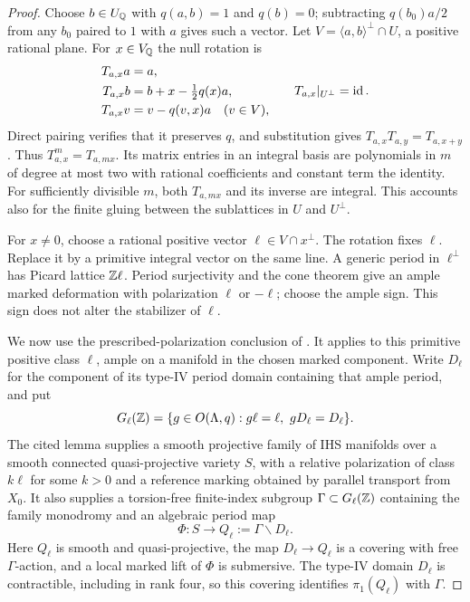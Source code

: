 \begin{proof}
Choose $b\in U_{\mathbb Q}$ with $q(a,b)=1$ and $q(b)=0$; subtracting
$q(b_0)a/2$ from any $b_0$ paired to $1$ with $a$ gives such a vector.
Let $V=\langle a,b\rangle^\perp\cap U$, a positive rational plane.
For $x\in V_{\mathbb Q}$ the null rotation is
\begin{equation}\label{secsys:null-rotation}
 \begin{split}
 T_{a,x}a&=a,\\
 T_{a,x}b&=b+x-\tfrac12 q(x)a,\\
 T_{a,x}v&=v-q(v,x)a\quad(v\in V),
 \end{split}
 \qquad T_{a,x}|_{U^\perp}=\operatorname{id}.
\end{equation}
Direct pairing verifies that it preserves $q$, and substitution gives
$T_{a,x}T_{a,y}=T_{a,x+y}$.  Thus $T_{a,x}^m=T_{a,mx}$.
Its matrix entries in an integral basis are polynomials in $m$ of degree
at most two with rational coefficients and constant term the identity.
For sufficiently divisible $m$, both $T_{a,mx}$ and its inverse are
integral.  This accounts also for the finite gluing between the
sublattices in $U$ and $U^\perp$.

For $x\ne0$, choose a rational positive vector
$\ell\in V\cap x^\perp$.  The rotation fixes $\ell$.  Replace it by
a primitive integral vector on the same line.  A generic period in
$\ell^\perp$ has Picard lattice $\mathbb Z\ell$.  Period surjectivity and
the cone theorem give an ample marked deformation with polarization
$\ell$ or $-\ell$; choose the ample sign.  This sign does not alter
the stabilizer of $\ell$.

We now use the prescribed-polarization conclusion of
\cite[Lemma~4.2]{StrongSYZ2026}.  It applies to this primitive positive
class $\ell$, ample on a manifold in the chosen marked component.
Write $D_\ell$ for the component of its type-IV period domain containing
that ample period, and put
\[
 G_\ell(\mathbb Z)=\{g\in O(\Lambda,q):g\ell=\ell,
                                      \ gD_\ell=D_\ell\}.
\]
The cited lemma supplies a smooth projective family of IHS manifolds
over a smooth connected quasi-projective variety $S$, with a relative
polarization of class $k\ell$ for some $k>0$ and a reference marking
obtained by parallel transport from $X_0$.  It also supplies a
torsion-free finite-index subgroup $\Gamma\subset G_\ell(\mathbb Z)$
containing the family monodromy and an algebraic period map
\[
           \Phi:S\longrightarrow Q_\ell:=\Gamma\backslash D_\ell.
\]
Here $Q_\ell$ is smooth and quasi-projective, the map
$D_\ell\to Q_\ell$ is a covering with free $\Gamma$-action, and a
local marked lift of $\Phi$ is submersive.  The type-IV domain
$D_\ell$ is contractible, including in rank four, so this covering
identifies $\pi_1(Q_\ell)$ with $\Gamma$.


\end{proof}
